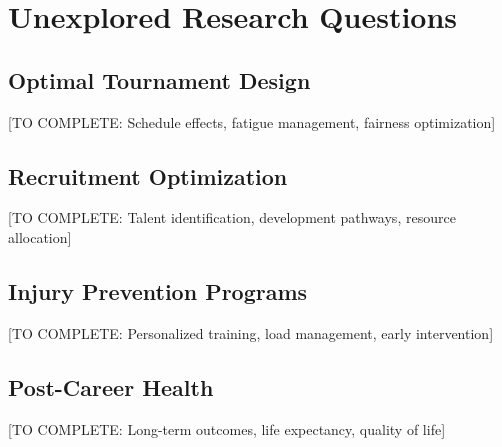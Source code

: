 \section{Unexplored Research Questions}

\subsection{Optimal Tournament Design}

[TO COMPLETE: Schedule effects, fatigue management, fairness optimization]

\subsection{Recruitment Optimization}

[TO COMPLETE: Talent identification, development pathways, resource allocation]

\subsection{Injury Prevention Programs}

[TO COMPLETE: Personalized training, load management, early intervention]

\subsection{Post-Career Health}

[TO COMPLETE: Long-term outcomes, life expectancy, quality of life]